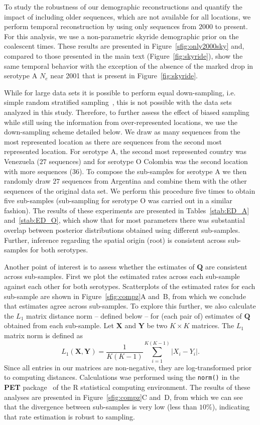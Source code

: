 \documentclass[a4paper,10pt]{article}
\begin{document}
To study the robustness of our demographic reconstructions and quantify the impact of including older sequences, which are not available for all locations, we perform temporal reconstruction by using only sequences from $2000$ to present.
For this analysis, we use a non-parametric skyride demographic prior \cite{M-skyride} on the coalescent times.
These results are presented in Figure~\ref{sfig:only2000sky} and, compared to those presented in the main text (Figure~\ref{fig:skyride}), show the same temporal behavior with the exception of the absence of the marked drop in serotype A $N_e$ near 2001 that is present in Figure~\ref{fig:skyride}.

While for large data sets it is possible to perform equal down-sampling, i.e. simple random stratified sampling~\cite{M-fluPNAS}, this is not possible with the data sets analyzed in this study. 
Therefore, to further assess the effect of biased sampling while still using the information from over-represented locations, we use the down-sampling scheme detailed below.
We draw as many sequences from the most represented location as there are sequences from the second most represented location.
For serotype A, the second most represented country was Venezuela ($27$ sequences) and for serotype O Colombia was the second location with more sequences ($36$).
To compose the sub-samples for serotype A we then randomly draw $27$ sequences from Argentina and combine them with the other sequences of the original data set.
We perform this procedure five times to obtain five sub-samples (sub-sampling for serotype O was carried out in a similar fashion).
The results of these experiments are presented in Tables~\ref{stab:ED_A} and~\ref{stab:ED_O}, which show that for most parameters there was substantial overlap between posterior distributions obtained using different sub-samples.
Further, inference regarding the spatial origin (root) is consistent across sub-samples for both serotypes.

Another point of interest is to assess whether the estimates of $\mathbf{Q}$ are consistent across sub-samples.
First we plot the estimated rates across each sub-sample against each other for both serotypes.
Scatterplots of the estimated rates for each sub-sample are shown in Figure~\ref{sfig:compz}A and~B, from which we conclude that estimates agree across sub-samples.
To explore this further, we also calculate the $L_1$ matrix distance norm -- defined below -- for (each pair of) estimates of $\mathbf{Q}$ obtained from each sub-sample.
Let $\mathbf{X}$ and $\mathbf{Y}$ be two $K \times K$ matrices.
The $L_1$ matrix norm is defined as
\begin{equation}
\label{seq:L1}
 L_1 (\mathbf{X}, \mathbf{Y}) = \frac{1}{K(K-1)} \sum_{i=1}^{K(K-1)} |X_i-Y_i|.
\end{equation}
Since all entries in our matrices are non-negative, they are log-transformed prior to computing distances.
Calculations wae performed using the \verb|norm()| in the \textbf{PET} package~\cite{PET} of the R statistical computing environment.
The results of these analyses are presented in Figure~\ref{sfig:compz}C and~D, from which we can see that the divergence between sub-samples is very low (less than $10\%$), indicating that rate estimation is robust to sampling.
\end{document}
